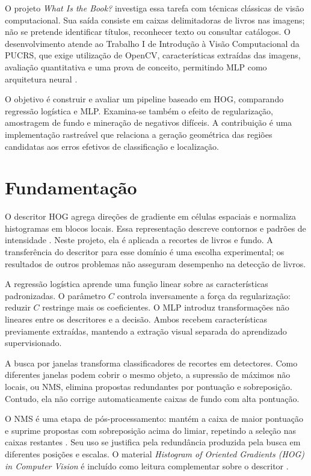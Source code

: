 \documentclass[12pt,a4paper,twocolumn]{article}
\begin{document}
O projeto \textit{What Is the Book?} investiga essa tarefa com técnicas clássicas de visão computacional. Sua saída consiste em caixas delimitadoras de livros nas imagens; não se pretende identificar títulos, reconhecer texto ou consultar catálogos. O desenvolvimento atende ao Trabalho I de Introdução à Visão Computacional da PUCRS, que exige utilização de OpenCV, características extraídas das imagens, avaliação quantitativa e uma prova de conceito, permitindo MLP como arquitetura neural \cite{enunciado}.

O objetivo é construir e avaliar um pipeline baseado em HOG, comparando regressão logística e MLP. Examina-se também o efeito de regularização, amostragem de fundo e mineração de negativos difíceis. A contribuição é uma implementação rastreável que relaciona a geração geométrica das regiões candidatas aos erros efetivos de classificação e localização.

\section{Fundamentação}
O descritor HOG agrega direções de gradiente em células espaciais e normaliza histogramas em blocos locais. Essa representação descreve contornos e padrões de intensidade \cite{dalal}. Neste projeto, ela é aplicada a recortes de livros e fundo. A transferência do descritor para esse domínio é uma escolha experimental; os resultados de outros problemas não asseguram desempenho na detecção de livros.

A regressão logística aprende uma função linear sobre as características padronizadas. O parâmetro $C$ controla inversamente a força da regularização: reduzir $C$ restringe mais os coeficientes. O MLP introduz transformações não lineares entre os descritores e a decisão. Ambos recebem características previamente extraídas, mantendo a extração visual separada do aprendizado supervisionado.

A busca por janelas transforma classificadores de recortes em detectores. Como diferentes janelas podem cobrir o mesmo objeto, a supressão de máximos não locais, ou NMS, elimina propostas redundantes por pontuação e sobreposição. Contudo, ela não corrige automaticamente caixas de fundo com alta pontuação.

O NMS é uma etapa de pós-processamento: mantém a caixa de maior pontuação e suprime propostas com sobreposição acima do limiar, repetindo a seleção nas caixas restantes \cite{nms}. Seu uso se justifica pela redundância produzida pela busca em diferentes posições e escalas. O material \textit{Histogram of Oriented Gradients (HOG) in Computer Vision} é incluído como leitura complementar sobre o descritor \cite{hogtutorial}.
\end{document}
